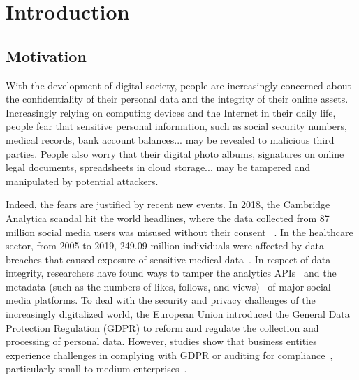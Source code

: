 \chapter{Introduction}

\section{Motivation}

With the development of digital society, people are increasingly
concerned about the confidentiality of their personal data and
the integrity of their online assets. Increasingly relying on
computing devices and the Internet in their daily life, people fear that
sensitive personal information, such as social security numbers,
medical records, bank account balances... may be revealed to malicious
third parties. People also worry that their digital photo albums,
signatures on online legal documents, spreadsheets in cloud storage...
may be tampered and manipulated by potential attackers.

Indeed, the fears are justified by recent new events.
In 2018, the Cambridge Analytica scandal hit the world headlines,
where the data collected from 87 million social media users was misused
without their consent
~\parencite{cadwalladr2018facebook,kitchgaessner2017cambridge,gonzalez2019global,hinds2020wouldn}.
In the healthcare sector, from 2005 to 2019, 249.09 million individuals
were affected by data breaches that caused exposure of sensitive medical
data~\parencite{seh2020healthcare}. In respect of data integrity, researchers
have found ways to tamper the analytics APIs~\parencite{pfeffer2018tampering} and
the metadata (such as the numbers of likes, follows, and views)~\parencite{paquet2017can}
of major social media platforms. To deal with the security and privacy
challenges of the increasingly digitalized world, the European Union introduced
the General Data Protection Regulation (GDPR) to reform and regulate
the collection and processing of personal data. However, studies show
that business entities experience challenges in complying with GDPR
or auditing for compliance~\parencite{smirnova2024understanding},
particularly small-to-medium enterprises~\parencite{sirur2018we,freitas2018gdpr,harting2021impacts}.


